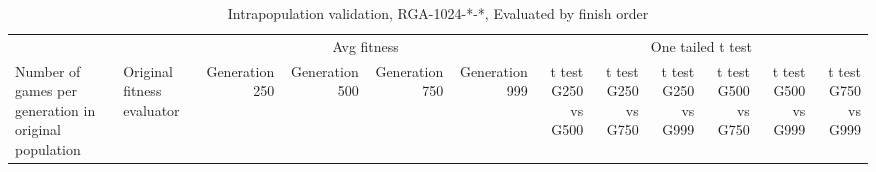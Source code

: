 \begin{landscape}
\begin{table}[ht]
  \centering
  \caption{Intrapopulation validation, RGA-1024-*-*, Evaluated by finish order}
    \begin{tabularx}{\linewidth}{|p{1in}|p{1in}|r|r|r|r|r|r|r|r|r|r|}
\cline{3-12}    \multicolumn{1}{l}{} &  & \multicolumn{4}{c|}{Avg fitness} & \multicolumn{6}{c|}{One tailed t test} \\ \cline{1-12}
    Number of games per generation in original population
    & Original fitness evaluator 
    & \multicolumn{1}{p{0.7in}|}{Generation 250} 
    & \multicolumn{1}{p{0.7in}|}{Generation 500}
    & \multicolumn{1}{p{0.7in}|}{Generation 750}
    & \multicolumn{1}{p{0.7in}|}{Generation 999}
    & \multicolumn{1}{X|}{t test G250 vs G500} 
    & \multicolumn{1}{X|}{t test G250 vs G750}
    & \multicolumn{1}{X|}{t test G250 vs G999}
    & \multicolumn{1}{X|}{t test G500 vs G750}
    & \multicolumn{1}{X|}{t test G500 vs G999}
    & \multicolumn{1}{X|}{t test G750 vs G999} \\ \cline{1-12}


\end{tabularx}
\end{table}
\end{landscape}
